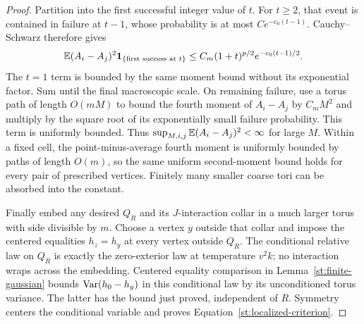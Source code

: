 \begin{proof}
Partition into the first successful integer value of $t$. For $t\ge2$,
that event is contained in failure at $t-1$, whose probability is at most
$Ce^{-c_0(t-1)}$. Cauchy--Schwarz therefore gives
\[
 \mathbb E(A_i-A_j)^2\mathbf 1_{\{\text{first success at }t\}}
 \le C_m(1+t)^{p/2}e^{-c_0(t-1)/2}.
\]
The $t=1$ term is bounded by the same moment bound without its exponential
factor. Sum until the final macroscopic scale. On remaining failure,
use a torus path of length $O(mM)$ to bound the fourth moment of
$A_i-A_j$ by $C_mM^2$ and multiply by the square root of its exponentially
small failure probability. This term is uniformly bounded. Thus
$\sup_{M,i,j}\mathbb E(A_i-A_j)^2<\infty$ for large $M$. Within a fixed cell,
the point-minus-average fourth moment is uniformly bounded by paths of
length $O(m)$, so the same uniform second-moment bound holds for every
pair of prescribed vertices. Finitely many smaller coarse tori can be
absorbed into the constant.

Finally embed any desired $Q_R$ and its $J$-interaction collar in a much
larger torus with side divisible by $m$. Choose a vertex $y$ outside that
collar and impose the centered equalities $h_z=h_y$ at every vertex outside
$Q_R$. The conditional relative law on $Q_R$ is exactly the zero-exterior
law at temperature $v^2k$; no interaction wraps across the embedding.
Centered equality comparison in Lemma~\ref{st:finite-gaussian} bounds
$\operatorname{Var}(h_0-h_y)$ in this conditional law by its unconditioned torus variance.
The latter has the bound just proved, independent of $R$. Symmetry centers
the conditional variable and proves Equation~\eqref{st:localized-criterion}.
\end{proof}
